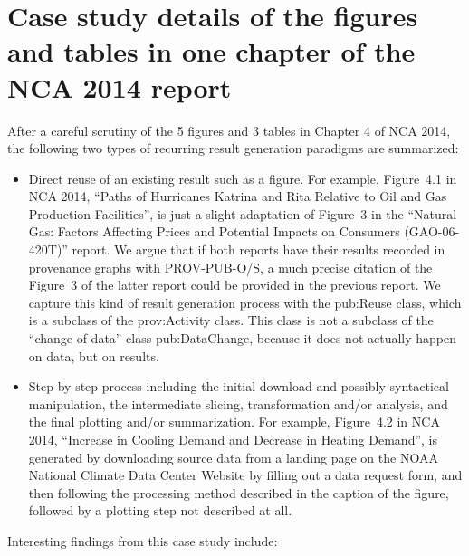 \chapter{Case study details of the figures and tables in one chapter of the NCA 2014 report}
\label{ch:case-study}
After a careful scrutiny of the 5 figures and 3 tables in Chapter 4 of NCA 2014, the following two types of recurring result generation paradigms are summarized:
\begin{itemize}
	\item Direct reuse of an existing result such as a figure. For example, Figure~4.1 in NCA 2014, ``Paths of Hurricanes Katrina and Rita Relative to Oil and Gas Production Facilities'', is just a slight adaptation of Figure~3 in the ``Natural Gas: Factors Affecting Prices and Potential Impacts on Consumers (GAO-06-420T)'' report. We argue that if both reports have their results recorded in provenance graphs with PROV-PUB-O/S, a much precise citation of the Figure~3 of the latter report could be provided in the previous report. We capture this kind of result generation process with the pub:Reuse class, which is a subclass of the prov:Activity class. This class is not a subclass of the ``change of data'' class pub:DataChange, because it does not actually happen on data, but on results.
	\item Step-by-step process including the initial download and possibly syntactical manipulation, the intermediate slicing, transformation and/or analysis, and the final plotting and/or summarization. For example, Figure~4.2 in NCA 2014, ``Increase in Cooling Demand and Decrease in Heating Demand'', is generated by downloading source data from a landing page on the NOAA National Climate Data Center Website by filling out a data request form, and then following the processing method described in the caption of the figure, followed by a plotting step not described at all.
\end{itemize}
Interesting findings from this case study include:
